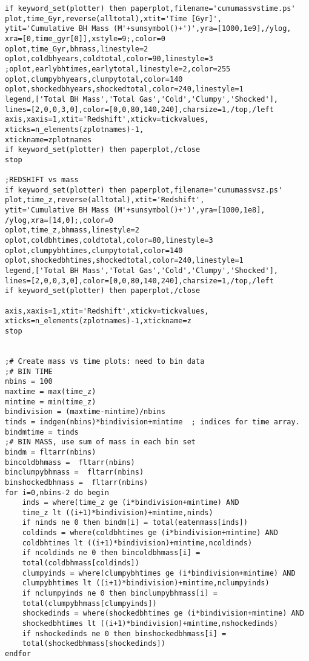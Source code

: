 \documentclass[12pt,headA,chapB]{fiskthesis}
\begin{document}
\begin{verbatim}
if keyword_set(plotter) then paperplot,filename='cumumassvstime.ps'
plot,time_Gyr,reverse(alltotal),xtit='Time [Gyr]',
ytit='Cumulative BH Mass (M'+sunsymbol()+')',yra=[1000,1e9],/ylog,
xra=[0,time_gyr[0]],xstyle=9;,color=0
oplot,time_Gyr,bhmass,linestyle=2
oplot,coldbhyears,coldtotal,color=90,linestyle=3
;oplot,earlybhtimes,earlytotal,linestyle=2,color=255
oplot,clumpybhyears,clumpytotal,color=140
oplot,shockedbhyears,shockedtotal,color=240,linestyle=1
legend,['Total BH Mass','Total Gas','Cold','Clumpy','Shocked'],
lines=[2,0,0,3,0],color=[0,0,80,140,240],charsize=1,/top,/left
axis,xaxis=1,xtit='Redshift',xtickv=tickvalues,
xticks=n_elements(zplotnames)-1,
xtickname=zplotnames
if keyword_set(plotter) then paperplot,/close
stop

;REDSHIFT vs mass
if keyword_set(plotter) then paperplot,filename='cumumassvsz.ps'
plot,time_z,reverse(alltotal),xtit='Redshift',
ytit='Cumulative BH Mass (M'+sunsymbol()+')',yra=[1000,1e8],
/ylog,xra=[14,0];,color=0
oplot,time_z,bhmass,linestyle=2
oplot,coldbhtimes,coldtotal,color=80,linestyle=3
oplot,clumpybhtimes,clumpytotal,color=140
oplot,shockedbhtimes,shockedtotal,color=240,linestyle=1
legend,['Total BH Mass','Total Gas','Cold','Clumpy','Shocked'],
lines=[2,0,0,3,0],color=[0,0,80,140,240],charsize=1,/top,/left
if keyword_set(plotter) then paperplot,/close

axis,xaxis=1,xtit='Redshift',xtickv=tickvalues,
xticks=n_elements(zplotnames)-1,xtickname=z
stop


;# Create mass vs time plots: need to bin data
;# BIN TIME
nbins = 100
maxtime = max(time_z)
mintime = min(time_z)
bindivision = (maxtime-mintime)/nbins
tinds = indgen(nbins)*bindivision+mintime  ; indices for time array.
bindmtime = tinds
;# BIN MASS, use sum of mass in each bin set
bindm = fltarr(nbins)
bincoldbhmass =  fltarr(nbins)
binclumpybhmass =  fltarr(nbins)
binshockedbhmass =  fltarr(nbins)
for i=0,nbins-2 do begin
    inds = where(time_z ge (i*bindivision+mintime) AND 
    time_z lt ((i+1)*bindivision)+mintime,ninds)
    if ninds ne 0 then bindm[i] = total(eatenmass[inds])
    coldinds = where(coldbhtimes ge (i*bindivision+mintime) AND 
    coldbhtimes lt ((i+1)*bindivision)+mintime,ncoldinds)
    if ncoldinds ne 0 then bincoldbhmass[i] = 
    total(coldbhmass[coldinds])
    clumpyinds = where(clumpybhtimes ge (i*bindivision+mintime) AND 
    clumpybhtimes lt ((i+1)*bindivision)+mintime,nclumpyinds)
    if nclumpyinds ne 0 then binclumpybhmass[i] = 
    total(clumpybhmass[clumpyinds])
    shockedinds = where(shockedbhtimes ge (i*bindivision+mintime) AND
    shockedbhtimes lt ((i+1)*bindivision)+mintime,nshockedinds)
    if nshockedinds ne 0 then binshockedbhmass[i] = 
    total(shockedbhmass[shockedinds])
endfor


\end{verbatim}
\end{document}
